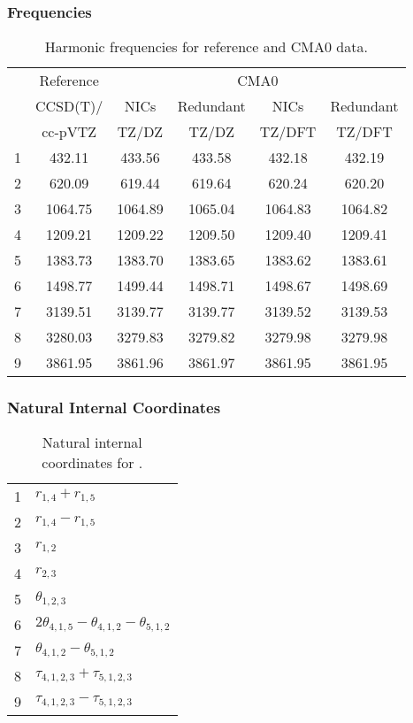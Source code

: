 \documentclass[10pt,oneside]{article}
\begin{document}
\begin{table}[h!]
\subsubsection*{Frequencies}
\centering
\caption{Harmonic frequencies for reference and CMA0 data.}
\begin{tabular}{cccccc}
\toprule
{} & Reference & \multicolumn{4}{c}{CMA0} \\
{} &  CCSD(T)/ &    NICs &  Redundant &    NICs & Redundant \\
{} &   cc-pVTZ &   TZ/DZ &      TZ/DZ &  TZ/DFT &    TZ/DFT \\
\midrule
1 &    432.11 &  433.56 &     433.58 &  432.18 &    432.19 \\
2 &    620.09 &  619.44 &     619.64 &  620.24 &    620.20 \\
3 &   1064.75 & 1064.89 &    1065.04 & 1064.83 &   1064.82 \\
4 &   1209.21 & 1209.22 &    1209.50 & 1209.40 &   1209.41 \\
5 &   1383.73 & 1383.70 &    1383.65 & 1383.62 &   1383.61 \\
6 &   1498.77 & 1499.44 &    1498.71 & 1498.67 &   1498.69 \\
7 &   3139.51 & 3139.77 &    3139.77 & 3139.52 &   3139.53 \\
8 &   3280.03 & 3279.83 &    3279.82 & 3279.98 &   3279.98 \\
9 &   3861.95 & 3861.96 &    3861.97 & 3861.95 &   3861.95 \\
\bottomrule
\end{tabular}
\end{table}

\begin{table}[h!]
\subsubsection*{Natural Internal Coordinates}
\centering
\caption{Natural internal coordinates for .}
\small
\begin{tabular}{ll}
\toprule
  1   & $r_{1,4} + r_{1,5}$ \\
  2   & $r_{1,4} - r_{1,5}$ \\
  3   & $r_{1,2}$ \\
  4   & $r_{2,3}$ \\
  5   & $\theta_{1,2,3}$ \\
  6   & $2\theta_{4,1,5} - \theta_{4,1,2} - \theta_{5,1,2}$ \\
  7   & $\theta_{4,1,2} - \theta_{5,1,2}$ \\
  8   & $\tau_{4,1,2,3} + \tau_{5,1,2,3}$ \\
  9   & $\tau_{4,1,2,3} - \tau_{5,1,2,3}$ \\
\bottomrule
\end{tabular}
\end{table}
\end{document}
